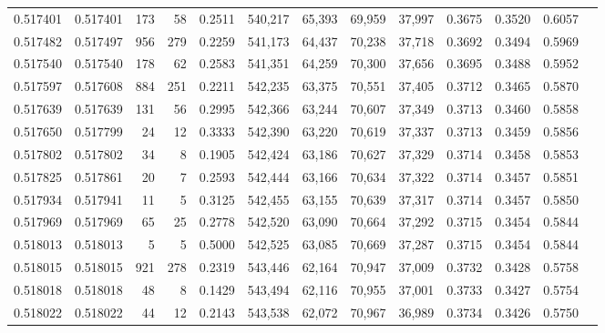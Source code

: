 \begin{tabular}{rrrrrrrrrrrrr}
0.517401 & 0.517401 &   173 &    58 &                                     0.2511 & 540,217 &  65,393 &  69,959 &  37,997 & 0.3675 & 0.3520 & 0.6057 \\
0.517482 & 0.517497 &   956 &   279 &                                     0.2259 & 541,173 &  64,437 &  70,238 &  37,718 & 0.3692 & 0.3494 & 0.5969 \\
0.517540 & 0.517540 &   178 &    62 &                                     0.2583 & 541,351 &  64,259 &  70,300 &  37,656 & 0.3695 & 0.3488 & 0.5952 \\
0.517597 & 0.517608 &   884 &   251 &                                     0.2211 & 542,235 &  63,375 &  70,551 &  37,405 & 0.3712 & 0.3465 & 0.5870 \\
0.517639 & 0.517639 &   131 &    56 &                                     0.2995 & 542,366 &  63,244 &  70,607 &  37,349 & 0.3713 & 0.3460 & 0.5858 \\
0.517650 & 0.517799 &    24 &    12 &                                     0.3333 & 542,390 &  63,220 &  70,619 &  37,337 & 0.3713 & 0.3459 & 0.5856 \\
0.517802 & 0.517802 &    34 &     8 &                                     0.1905 & 542,424 &  63,186 &  70,627 &  37,329 & 0.3714 & 0.3458 & 0.5853 \\
0.517825 & 0.517861 &    20 &     7 &                                     0.2593 & 542,444 &  63,166 &  70,634 &  37,322 & 0.3714 & 0.3457 & 0.5851 \\
0.517934 & 0.517941 &    11 &     5 &                                     0.3125 & 542,455 &  63,155 &  70,639 &  37,317 & 0.3714 & 0.3457 & 0.5850 \\
0.517969 & 0.517969 &    65 &    25 &                                     0.2778 & 542,520 &  63,090 &  70,664 &  37,292 & 0.3715 & 0.3454 & 0.5844 \\
0.518013 & 0.518013 &     5 &     5 &                                     0.5000 & 542,525 &  63,085 &  70,669 &  37,287 & 0.3715 & 0.3454 & 0.5844 \\
0.518015 & 0.518015 &   921 &   278 &                                     0.2319 & 543,446 &  62,164 &  70,947 &  37,009 & 0.3732 & 0.3428 & 0.5758 \\
0.518018 & 0.518018 &    48 &     8 &                                     0.1429 & 543,494 &  62,116 &  70,955 &  37,001 & 0.3733 & 0.3427 & 0.5754 \\
0.518022 & 0.518022 &    44 &    12 &                                     0.2143 & 543,538 &  62,072 &  70,967 &  36,989 & 0.3734 & 0.3426 & 0.5750 \\

\end{tabular}
